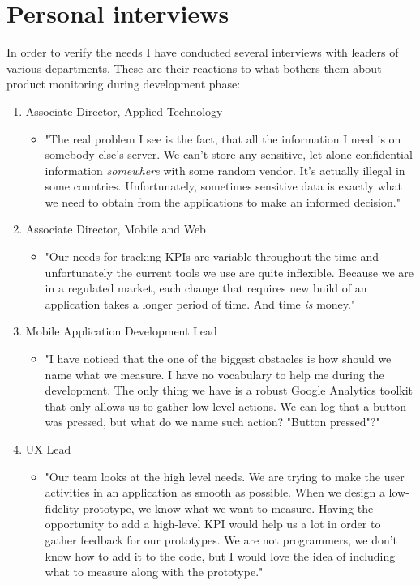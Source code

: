 \section{Personal interviews}

In order to verify the needs I have conducted several interviews with leaders of various departments. These are their reactions to what bothers them about product monitoring during development phase:

\begin{enumerate}
		\item Associate Director, Applied Technology
		\begin{itemize}
				\item[] "The real problem I see is the fact, that all the information I need is on somebody else's server. We can't store any sensitive, let alone confidential information \emph{somewhere} with some random vendor. It's actually illegal in some countries. Unfortunately, sometimes sensitive data is exactly what we need to obtain from the applications to make an informed decision."
		\end{itemize}	

		\item Associate Director, Mobile and Web
		\begin{itemize}
				\item[] "Our needs for tracking KPIs are variable throughout the time and unfortunately the current tools we use are quite inflexible. Because we are in a regulated market, each change that requires new build of an application takes a longer period of time. And time \emph{is} money."
		\end{itemize}				
		
		\item Mobile Application Development Lead
		\begin{itemize}
				\item[] "I have noticed that the one of the biggest obstacles is how should we name what we measure. I have no vocabulary to help me during the development. The only thing we have is a robust Google Analytics toolkit that only allows us to gather low-level actions. We can log that a button was pressed, but what do we name such action? "Button pressed"?"
		\end{itemize}
		
		\item UX Lead
		\begin{itemize}
				\item[] "Our team looks at the high level needs. We are trying to make the user activities in an application as smooth as possible. When we design a low-fidelity prototype, we know what we want to measure. Having the opportunity to add a high-level KPI would help us a lot in order to gather feedback for our prototypes. We are not programmers, we don't know how to add it to the code, but I would love the idea of including what to measure along with the prototype."
		\end{itemize}
\end{enumerate}

